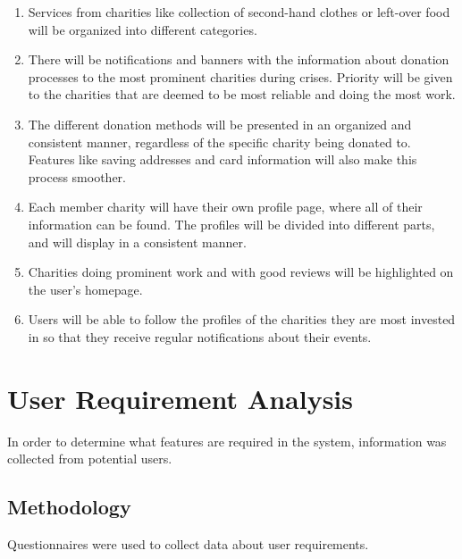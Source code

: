 \documentclass{scrreprt}
\begin{document}
        \begin{enumerate}
            
            \item Services from charities like collection of second-hand clothes or left-over food will be organized into different categories.
            
            \item There will be notifications and banners with the information about donation processes to the most prominent charities during crises. Priority will be given to the charities that are deemed to be most reliable and doing the most work.
            
            \item The different donation methods will be presented in an organized and consistent manner, regardless of the specific charity being donated to. Features like saving addresses and card information will also make this process smoother.
            
            \item Each member charity will have their own profile page, where all of their information can be found. The profiles will be divided into different parts, and will display in a consistent manner.
            
            \item Charities doing prominent work and with good reviews will be highlighted on the user's homepage.
            
            \item Users will be able to follow the profiles of the charities they are most invested in so that they receive regular notifications about their events.

        \end{enumerate}


\chapter{User Requirement Analysis}

    In order to determine what features are required in the system, information was collected from potential users.
    
    \section{Methodology}
    
    Questionnaires were used to collect data about user requirements.\par
    
\end{document}
